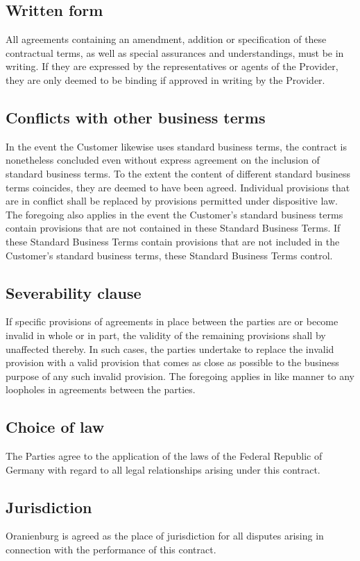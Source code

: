 \documentclass{terms}
\begin{document}
\subsection{Written form}
All agreements containing an amendment, addition or specification of these contractual terms, as well as special assurances and understandings, must be in writing.
If they are expressed by the representatives or agents of the Provider, they are only deemed to be binding if approved in writing by the Provider.

\subsection{Conflicts with other business terms}
In the event the Customer likewise uses standard business terms, the contract is nonetheless concluded even without express agreement on the inclusion of standard business terms.
To the extent the content of different standard business terms coincides, they are deemed to have been agreed.
Individual provisions that are in conflict shall be replaced by provisions permitted under dispositive law.
The foregoing also applies in the event the Customer's standard business terms contain provisions that are not contained in these Standard Business Terms.
If these Standard Business Terms contain provisions that are not included in the Customer's standard business terms, these Standard Business Terms control.

\subsection{Severability clause}
If specific provisions of agreements in place between the parties are or become invalid in whole or in part, the validity of the remaining provisions shall by unaffected thereby.
In such cases, the parties undertake to replace the invalid provision with a valid provision that comes as close as possible to the business purpose of any such invalid provision.
The foregoing applies in like manner to any loopholes in agreements between the parties.

\subsection{Choice of law}
The Parties agree to the application of the laws of the Federal Republic of Germany with regard to all legal relationships arising under this contract.

\subsection{Jurisdiction}
Oranienburg is agreed as the place of jurisdiction for all disputes arising in connection with the performance of this contract.
\end{document}
